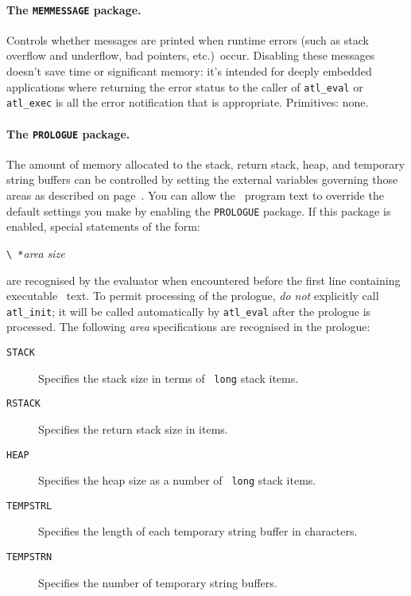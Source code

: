 \documentclass[twocolumn]{article}
\begin{document}
\paragraph{The {\tt MEMMESSAGE} package.}
Controls whether messages are printed when runtime errors
(such as stack overflow and underflow, bad pointers, etc.)\ occur.
Disabling these messages doesn't save time or significant memory: it's
intended for deeply embedded applications where returning the error
status to the caller of \verb+atl_eval+ or \verb+atl_exec+ is all the
error notification that is appropriate.  Primitives: none.

\paragraph{The {\tt PROLOGUE} package.}
\label{`prologue'}
The amount of memory allocated to the stack, return stack, heap, and
temporary string buffers can be controlled by setting the external
variables governing those areas as described on
page~\pageref{`memall'}.  You can allow the \atlast\ program text to
override the default settings you make by enabling the {\tt PROLOGUE}
package.  If this package is enabled, special statements of the form:

\verb+\ *+{\em area} {\em size}

are recognised by the evaluator when encountered before the first line
containing executable \atlast\ text.  To permit processing of the
prologue, {\em do not} explicitly call \verb+atl_init+; it will be
called automatically by \verb+atl_eval+ after the prologue is
processed.  The following {\em area} specifications are recognised in
the prologue:

\begin{description}
\item[{\tt STACK}]      Specifies the stack size in terms of {\tt
                        long} stack items.
\item[{\tt RSTACK}]     Specifies the return stack size in items.
\item[{\tt HEAP}]       Specifies the heap size as a number of {\tt
                        long} stack items.
\item[{\tt TEMPSTRL}]   Specifies the length of each temporary string
                        buffer in characters.
\item[{\tt TEMPSTRN}]   Specifies the number of temporary string
                        buffers.
\end{description}
\end{document}
